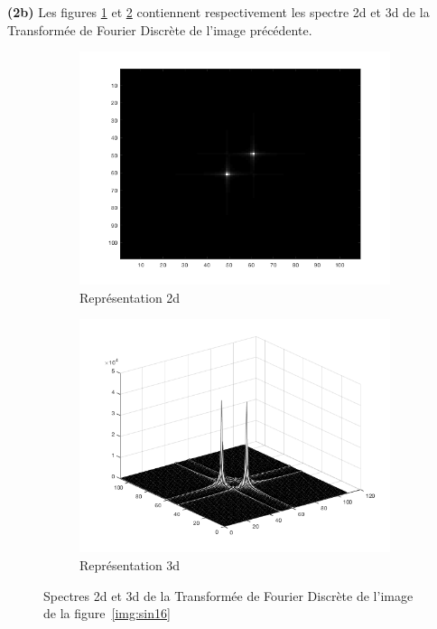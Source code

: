 \documentclass[a4paper]{article}
\newcommand{\figref}[1]{figure~\ref{#1}}
\begin{document}
\textbf{(2b)} Les figures \ref{subimg:ft-sin16-2d} et \ref{subimg:ft-sin16-3d}
contiennent respectivement les spectre 2d et 3d de la Transformée de Fourier
Discrète de l'image précédente.

\begin{figure}[H]
    \centering
    \begin{subfigure}[c]{0.46\textwidth}
        \centering
        \includegraphics[width=\textwidth]{images/ft1.png}
        \caption{Représentation 2d} 
    \label{subimg:ft-sin16-2d}
    \end{subfigure}
    \begin{subfigure}[c]{0.46\textwidth}
        \centering
        \includegraphics[width=\textwidth]{images/ft13D.png}
        \caption{Représentation 3d}
    \label{subimg:ft-sin16-3d}
    \end{subfigure}
    \label{fig:ft-sin16}
    \caption{Spectres 2d et 3d de la Transformée de Fourier Discrète de
    l'image de la \figref{img:sin16}}
\end{figure}
\end{document}
